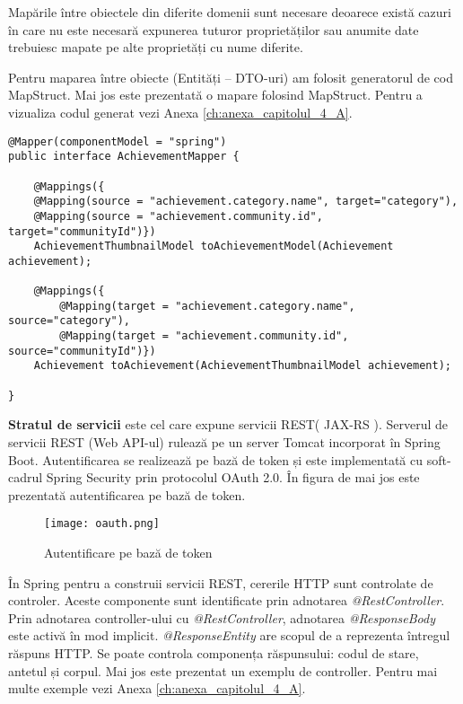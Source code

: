 	Mapările între obiectele din diferite domenii sunt necesare deoarece există cazuri în care 
nu este necesară expunerea tuturor proprietăților sau anumite date trebuiesc mapate pe alte 
proprietăți cu nume diferite.

Pentru maparea între obiecte (Entități – DTO-uri) am folosit generatorul de cod MapStruct.
Mai jos este prezentată o mapare folosind MapStruct. Pentru a vizualiza codul generat vezi 
Anexa \ref{ch:anexa_capitolul_4_A}.
\begin {lstlisting}
@Mapper(componentModel = "spring")
public interface AchievementMapper {

	@Mappings({
	@Mapping(source = "achievement.category.name", target="category"),
	@Mapping(source = "achievement.community.id", target="communityId")})
    AchievementThumbnailModel toAchievementModel(Achievement achievement);

	@Mappings({
		@Mapping(target = "achievement.category.name", source="category"),
		@Mapping(target = "achievement.community.id", source="communityId")})
	Achievement toAchievement(AchievementThumbnailModel achievement);

}

\end{lstlisting}

\textbf{Stratul de servicii} este cel care expune servicii REST( JAX-RS ).
Serverul de servicii REST (Web API-ul) rulează pe un server Tomcat incorporat în Spring
Boot. Autentificarea se realizează pe bază de token și este implementată cu soft-cadrul Spring
Security prin protocolul OAuth 2.0. În figura de mai jos este prezentată autentificarea pe bază de token.

\begin{figure}[h]
\texttt{[image: oauth.png]}
\centering
\caption{Autentificare pe bază de token\cite{OAuth2}}
\label{fig:oauth}
\end{figure}    

În Spring pentru a construii servicii REST, cererile HTTP sunt controlate de controler. 
Aceste componente sunt identificate prin adnotarea \textit{@RestController}.
Prin adnotarea controller-ului cu \textit{@RestController}, adnotarea \textit{@ResponseBody} este activă în mod 
implicit. \textit{@ResponseEntity} are scopul de a reprezenta întregul răspuns HTTP. Se poate controla 
componența răspunsului: codul de stare, antetul și corpul. Mai jos este prezentat un exemplu de controller. 
Pentru mai multe exemple vezi Anexa \ref{ch:anexa_capitolul_4_A}.

